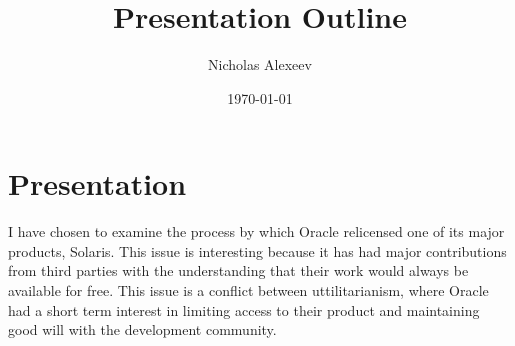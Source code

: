 \documentclass{article}
\title{Presentation Outline }
\author{Nicholas Alexeev }
\date{\today}
\begin{document}
\maketitle


\section{Presentation}
I have chosen to examine the process by which Oracle relicensed one of its major products, Solaris. 
This issue is interesting because it has had major contributions from third parties 
with the understanding that their work would always be available for free. This issue
is a conflict between uttilitarianism, where Oracle had a short term interest in 
limiting access to their product and maintaining good will with the development community.
\end{document}
